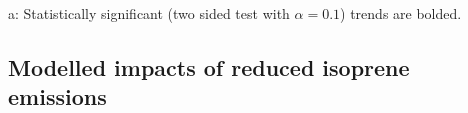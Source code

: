 \begin{table}
\begin{threeparttable}
\begin{tabular}{ l | c  c }
          \bottomrule
        \end{tabular}
        \begin{tablenotes} 
          \small
          \item a: Statistically significant (two sided test with $\alpha=0.1$) trends are bolded.
        \end{tablenotes}
        \label{BioIsop:results:trends:tab_trends}
      \end{threeparttable}\end{table}
      
      
   
  \subsection{Modelled impacts of reduced isoprene emissions}
    \label{BioIsop:results:new_emiss}
    
